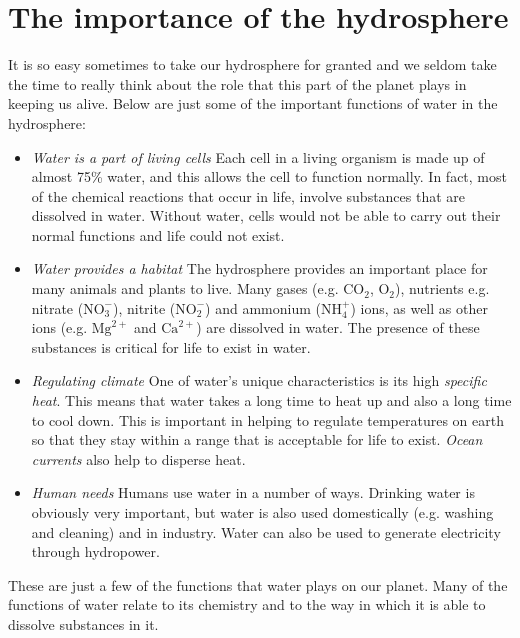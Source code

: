     \section{The importance of the hydrosphere}
            \nopagebreak
      \label{m38138*id335077}It is so easy sometimes to take our hydrosphere for granted and we seldom take the time to really think about the role that this part of the planet plays in keeping us alive. Below are just some of the important functions of water in the hydrosphere:\par 
      \label{m38138*id335082}\begin{itemize}[noitemsep]
            \label{m38138*uid15}\item \textsl{Water is a part of living cells}
Each cell in a living organism is made up of almost 75\% water, and this allows the cell to function normally. In fact, most of the chemical reactions that occur in life, involve substances that are dissolved in water. Without water, cells would not be able to carry out their normal functions and life could not exist.
\label{m38138*uid16}\item \textsl{Water provides a habitat}
The hydrosphere provides an important place for many animals and plants to live. Many gases (e.g. ${\text{CO}}_{2}$, ${\text{O}}_{2}$), nutrients e.g. nitrate ($\text{NO}_{3}^{-}$), nitrite ($\text{NO}_{2}^{-}$) and ammonium ($\text{NH}_{4}^{+}$) ions, as well as other ions (e.g. ${\text{Mg}}^{2+}$ and ${\text{Ca}}^{2+}$) are dissolved in water. The presence of these substances is critical for life to exist in water.
\label{m38138*uid17}\item \textsl{Regulating climate}
One of water's unique characteristics is its high \textsl{specific heat}. This means that water takes a long time to heat up and also a long time to cool down. This is important in helping to regulate temperatures on earth so that they stay within a range that is acceptable for life to exist. \textsl{Ocean currents} also help to disperse heat.
\label{m38138*uid18}\item \textsl{Human needs}
Humans use water in a number of ways. Drinking water is obviously very important, but water is also used domestically (e.g. washing and cleaning) and in industry. Water can also be used to generate electricity through hydropower.
\end{itemize}
      \label{m38138*id335280}These are just a few of the functions that water plays on our planet. Many of the functions of water relate to its chemistry and to the way in which it is able to dissolve substances in it.\par 
